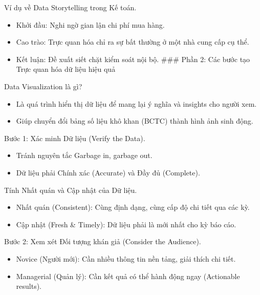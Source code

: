 \documentclass[aspectratio=169]{beamer}
\begin{document}
\begin{frame}{Ví dụ về Data Storytelling trong Kế toán.}
    \begin{itemize}
        \item Khởi đầu: Nghi ngờ gian lận chi phí mua hàng.
        \item Cao trào: Trực quan hóa chỉ ra sự bất thường ở một nhà cung cấp cụ thể.
        \item Kết luận: Đề xuất siết chặt kiểm soát nội bộ.
        ### Phần 2: Các bước tạo Trực quan hóa dữ liệu hiệu quả
    \end{itemize}
\end{frame}


\begin{frame}{Data Visualization là gì?}
    \begin{itemize}
        \item Là quá trình hiển thị dữ liệu để mang lại ý nghĩa và insights cho người xem.
        \item Giúp chuyển đổi bảng số liệu khô khan (BCTC) thành hình ảnh sinh động.
    \end{itemize}
\end{frame}


\begin{frame}{Bước 1: Xác minh Dữ liệu (Verify the Data).}
    \begin{itemize}
        \item Tránh nguyên tắc Garbage in, garbage out.
        \item Dữ liệu phải Chính xác (Accurate) và Đầy đủ (Complete).
    \end{itemize}
\end{frame}


\begin{frame}{Tính Nhất quán và Cập nhật của Dữ liệu.}
    \begin{itemize}
        \item Nhất quán (Consistent): Cùng định dạng, cùng cấp độ chi tiết qua các kỳ.
        \item Cập nhật (Fresh \& Timely): Dữ liệu phải là mới nhất cho kỳ báo cáo.
    \end{itemize}
\end{frame}


\begin{frame}{Bước 2: Xem xét Đối tượng khán giả (Consider the Audience).}
    \begin{itemize}
        \item Novice (Người mới): Cần nhiều thông tin nền tảng, giải thích chi tiết.
        \item Managerial (Quản lý): Cần kết quả có thể hành động ngay (Actionable results).
    \end{itemize}
\end{frame}
\end{document}
